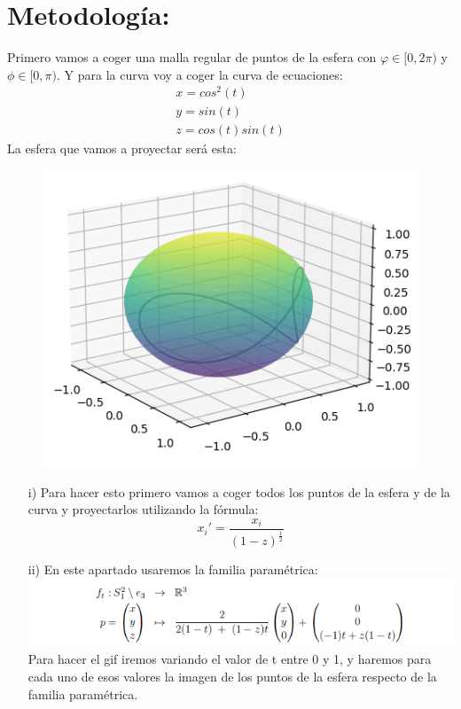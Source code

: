 \documentclass[11pt,a4paper,openright]{article}
\begin{document}
\section{Metodología:}
Primero vamos a coger una malla regular de puntos de la esfera con $\varphi \in [0,2\pi)$ y $\phi \in [0,\pi)$. Y para la curva voy a coger la curva de ecuaciones:
\begin{eqnarray*}
x=cos^2(t)\\
y=sin(t)\\
z=cos(t)sin(t)
\end{eqnarray*}
La esfera que vamos a proyectar será esta:
\begin{figure}[H]
\centering
\includegraphics[scale=.75]{Esfera.png}
\end{figure}
\begin{enumerate}
\item[i)]Para hacer esto primero vamos a coger todos los puntos de la esfera y de la curva y proyectarlos utilizando la fórmula:
\begin{equation*}
x_i\prime=\frac{x_i}{(1-z)^\frac{1}{2}}
\end{equation*}

\item[ii)]En este apartado usaremos la familia paramétrica:\\
\includegraphics[scale=1.5]{famparam.png}\\
Para hacer el gif iremos variando el valor de t entre 0 y 1, y haremos para cada uno de esos valores la imagen de los puntos de la esfera respecto de la familia paramétrica.
\end{enumerate}
\end{document}

